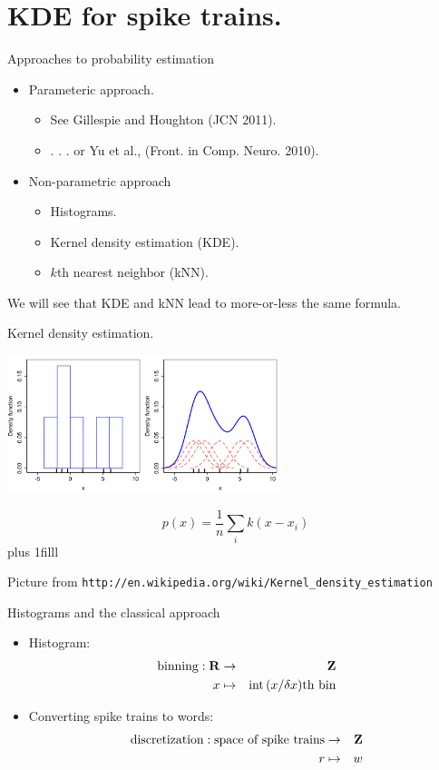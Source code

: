 \documentclass{beamer}
\newcommand{\btVFill}{\vskip0pt plus 1filll}
\begin{document}
\section{KDE for spike trains.}

\begin{frame}{Approaches to probability estimation}
\begin{itemize}
\item Parameteric approach.
\begin{itemize} 
\item See Gillespie and Houghton (JCN 2011).
\item . . . or Yu et al., (Front. in Comp. Neuro. 2010).
\end{itemize}
\item Non-parametric approach
\begin{itemize}
\item Histograms.
\item Kernel density estimation (KDE).
\item $k$th nearest neighbor (kNN).
\end{itemize}
\end{itemize}
We will see that KDE and kNN lead to more-or-less the same formula.
\end{frame}


\begin{frame}{Kernel density estimation.}
\begin{center}
\includegraphics[width=8cm]{Comparison_of_1D_histogram_and_KDE.png}
\end{center}
\color{dark}
$$
p(x)=\frac{1}{n}\sum_ik(x-x_i)
$$
\color{black}
\btVFill
\begin{flushright}
\tiny{Picture from \texttt{http://en.wikipedia.org/wiki/Kernel\_density\_estimation}}
\end{flushright}
\end{frame}

\begin{frame}{Histograms and the classical approach}
\begin{itemize}
\item Histogram:
\color{dark} 
\begin{eqnarray*}
\mbox{binning}: \mathbf{R}&\rightarrow&\mathbf{Z}\cr
                         x&\mapsto& \mbox{int}\,(x/\delta x)\mbox{th bin} 
\end{eqnarray*}
\color{black}
\item Converting spike trains to words:
\color{dark}
\begin{eqnarray*}
\mbox{discretization}: \mbox{space of spike trains}&\rightarrow&\mathbf{Z}\cr
                         r&\mapsto& w
\end{eqnarray*}
\color{black}
\end{itemize}
\end{frame}
\end{document}
